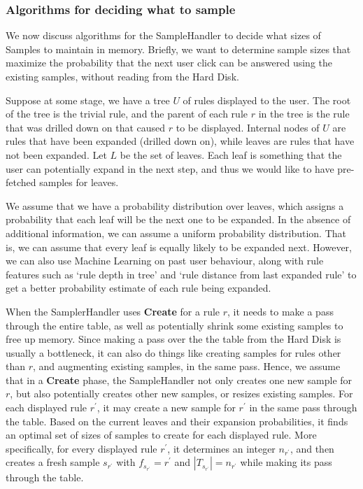 \subsubsection{Algorithms for deciding what to sample}\label{sec:sampling_algorithms}
We now discuss algorithms for the SampleHandler to decide what sizes of Samples to maintain in memory. Briefly, we want to determine sample sizes that maximize the probability that the next user click can be answered using the existing samples, without reading from the Hard Disk. 

Suppose at some stage, we have a tree $U$ of rules displayed to the user. The root of the tree is the trivial rule, and the parent of each rule $r$ in the tree is the rule that was drilled down on that caused $r$ to be displayed. Internal nodes of $U$ are rules that have been expanded (drilled down on), while leaves are rules that have not been expanded. Let $L$ be the set of leaves. Each leaf is something that the user can potentially expand in the next step, and thus we would like to have pre-fetched samples for leaves.

We assume that we have a probability distribution over leaves, which assigns a probability that each leaf will be the next one to be expanded. In the absence of additional information, we can assume a uniform probability distribution. That is, we can assume that every leaf is equally likely to be expanded next. However, we can also use Machine Learning on past user behaviour, along with rule features such as `rule depth in tree' and `rule distance from last expanded rule' to get a better probability estimate of each rule being expanded. 

When the SamplerHandler uses \textbf{Create} for a rule $r$, it needs to make a pass through the entire table, as well as potentially shrink some existing samples to free up memory. Since making a pass over the the table from the Hard Disk is usually a bottleneck, it can also do things like creating samples for rules other than $r$, and augmenting existing samples, in the same pass. Hence, we assume that in a \textbf{Create} phase, the SampleHandler not only creates one new sample for $r$, but also potentially creates other new samples, or resizes existing samples. For each displayed rule $r^{\prime}$, it may create a new sample for $r^{\prime}$ in the same pass through the table. Based on the current leaves and their expansion probabilities, it finds an optimal set of sizes of samples to create for each displayed rule. More specifically, for every displayed rule $r^{\prime}$, it determines an integer $n_{r^{\prime}}$, and then creates a fresh sample $s_{r^{\prime}}$ with $f_{s_{r^{\prime}}} = r^{\prime}$ and $|T_{s_{r^{\prime}}}| = n_{r^{\prime}}$ while making its pass through the table. 

